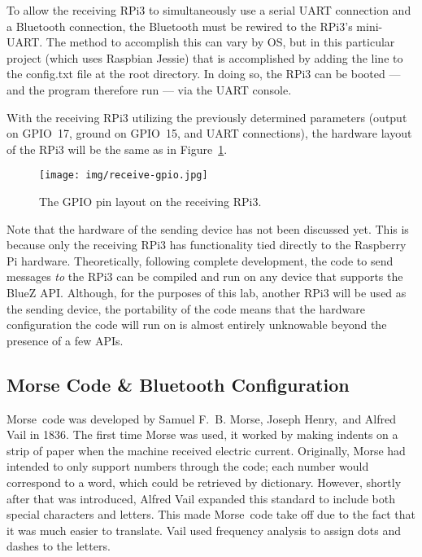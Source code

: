 \documentclass[11pt]{article}
\begin{document}
To allow the receiving RPi3 to simultaneously use a serial UART connection and a Bluetooth connection, the Bluetooth must be rewired to the RPi3's mini-UART.
The method to accomplish this can vary by OS, but in this particular project (which uses Raspbian Jessie) that is accomplished by adding the line  to the config.txt file at the root directory.
In doing so, the RPi3 can be booted --- and the program therefore run --- via the UART console.


With the receiving RPi3 utilizing the previously determined parameters (output on GPIO~17, ground on GPIO~15, and UART connections), the hardware layout of the RPi3 will be the same as in Figure~\ref{fig:receive-gpio}.


\begin{figure}[ht]
    \centering
    \texttt{[image: img/receive-gpio.jpg]}
    \caption{The GPIO pin layout on the receiving RPi3.}
    \label{fig:receive-gpio}
\end{figure}


Note that the hardware of the sending device has not been discussed yet.
This is because only the receiving RPi3 has functionality tied directly to the Raspberry Pi hardware.
Theoretically, following complete development, the code to send messages \emph{to} the RPi3 can be compiled and run on any device that supports the BlueZ API.
Although, for the purposes of this lab, another RPi3 will be used as the sending device, the portability of the code means that the hardware configuration the code will run on is almost entirely unknowable beyond the presence of a few APIs.


\subsection{Morse Code \& Bluetooth Configuration}
\label{sub:morse_code_&_bluetooth_configuration}


Morse~code was developed by Samuel F.~B. Morse, Joseph Henry,~and Alfred Vail in 1836.
The first time Morse was used, it worked by making indents on a strip of paper when the machine received electric current.
Originally, Morse had intended to only support numbers through the code; each number would correspond to a word, which could be retrieved by dictionary.
However, shortly after that was introduced, Alfred Vail expanded this standard to include both special characters and letters.
This made Morse~code take off due to the fact that it was much easier to translate.
Vail used frequency analysis to assign dots and dashes to the letters.
\end{document}
